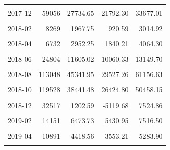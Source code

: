 \begin{longtable}[t]{crrrr}
\cellcolor{gray!10}{2017-11} & \cellcolor{gray!10}{93193} & \cellcolor{gray!10}{35381.42} & \cellcolor{gray!10}{29556.68} & \cellcolor{gray!10}{41206.16}\\
2017-12 & 59056 & 27734.65 & 21792.30 & 33677.01\\
\cellcolor{gray!10}{2018-01} & \cellcolor{gray!10}{14785} & \cellcolor{gray!10}{3923.35} & \cellcolor{gray!10}{1964.26} & \cellcolor{gray!10}{5882.43}\\
2018-02 & 8269 & 1967.75 & 920.59 & 3014.92\\
\cellcolor{gray!10}{2018-03} & \cellcolor{gray!10}{9943} & \cellcolor{gray!10}{4402.35} & \cellcolor{gray!10}{2595.34} & \cellcolor{gray!10}{6209.36}\\
2018-04 & 6732 & 2952.25 & 1840.21 & 4064.30\\
\cellcolor{gray!10}{2018-05} & \cellcolor{gray!10}{14355} & \cellcolor{gray!10}{6550.54} & \cellcolor{gray!10}{5715.71} & \cellcolor{gray!10}{7385.36}\\
2018-06 & 24804 & 11605.02 & 10060.33 & 13149.70\\
\cellcolor{gray!10}{2018-07} & \cellcolor{gray!10}{55804} & \cellcolor{gray!10}{21642.24} & \cellcolor{gray!10}{20629.86} & \cellcolor{gray!10}{22654.63}\\
2018-08 & 113048 & 45341.95 & 29527.26 & 61156.63\\
\cellcolor{gray!10}{2018-09} & \cellcolor{gray!10}{210659} & \cellcolor{gray!10}{85403.05} & \cellcolor{gray!10}{62904.03} & \cellcolor{gray!10}{107902.06}\\
2018-10 & 119528 & 38441.48 & 26424.80 & 50458.15\\
\cellcolor{gray!10}{2018-11} & \cellcolor{gray!10}{61813} & \cellcolor{gray!10}{13595.59} & \cellcolor{gray!10}{5372.41} & \cellcolor{gray!10}{21818.78}\\
2018-12 & 32517 & 1202.59 & -5119.68 & 7524.86\\
\cellcolor{gray!10}{2019-01} & \cellcolor{gray!10}{22027} & \cellcolor{gray!10}{8289.69} & \cellcolor{gray!10}{6012.75} & \cellcolor{gray!10}{10566.63}\\
2019-02 & 14151 & 6473.73 & 5430.95 & 7516.50\\
\cellcolor{gray!10}{2019-03} & \cellcolor{gray!10}{22528} & \cellcolor{gray!10}{19345.24} & \cellcolor{gray!10}{14798.73} & \cellcolor{gray!10}{23891.74}\\
2019-04 & 10891 & 4418.56 & 3553.21 & 5283.90\\
\cellcolor{gray!10}{2019-05} & \cellcolor{gray!10}{12337} & \cellcolor{gray!10}{5520.16} & \cellcolor{gray!10}{4525.23} & \cellcolor{gray!10}{6515.09}\\

\end{longtable}
